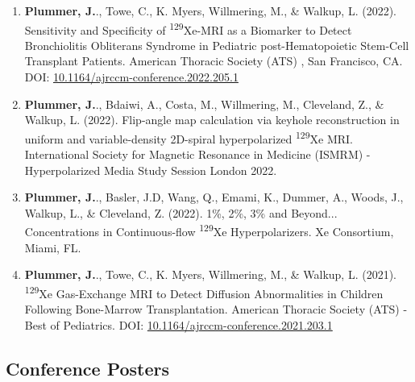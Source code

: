 \documentclass[12pt,]{scrartcl}
\begin{document}
\begin{enumerate}
  \item \textbf{Plummer, J.}., Towe, C., K. Myers, Willmering, M., \& Walkup, L. (2022). Sensitivity and Specificity of \textsuperscript{129}Xe-MRI as a Biomarker to Detect Bronchiolitis Obliterans Syndrome in Pediatric post-Hematopoietic Stem-Cell Transplant Patients. American Thoracic Society (ATS) , San Francisco, CA. DOI: \href{https://www.atsjournals.org/doi/abs/10.1164/ajrccm-conference.2022.205.1_MeetingAbstracts.A2181}{10.1164/ajrccm-conference.2022.205.1}
  
  \item \textbf{Plummer, J.}., Bdaiwi, A., Costa, M., Willmering, M., Cleveland, Z., \& Walkup, L. (2022). Flip-angle map calculation via keyhole reconstruction in uniform and variable-density 2D-spiral hyperpolarized \textsuperscript{129}Xe MRI. International Society for Magnetic Resonance in Medicine (ISMRM) - Hyperpolarized Media Study Session London 2022.
  
  \item \textbf{Plummer, J.}., Basler, J.D, Wang, Q., Emami, K., Dummer, A., Woods, J., Walkup, L., \& Cleveland, Z. (2022). 1\%, 2\%, 3\% and Beyond... Concentrations in Continuous-flow \textsuperscript{129}Xe Hyperpolarizers. Xe Consortium, Miami, FL.
  
  \item \textbf{Plummer, J.}., Towe, C., K. Myers, Willmering, M., \& Walkup, L. (2021). \textsuperscript{129}Xe Gas-Exchange MRI to Detect Diffusion Abnormalities in Children Following Bone-Marrow Transplantation. American Thoracic Society (ATS) - Best of Pediatrics. DOI: \href{http://dx.doi.org/10.1164/ajrccm-conference.2021.203.1_MeetingAbstracts.A1166}{10.1164/ajrccm-conference.2021.203.1}
  
  
\end{enumerate}



\subsection{Conference Posters}\label{conferences}
\end{document}
